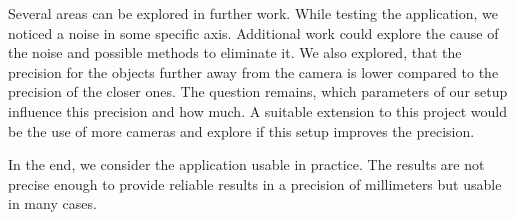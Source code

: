 Several areas can be explored in further work. While testing the application,
we noticed a noise in some specific axis. Additional work could explore the
cause of the noise and possible methods to eliminate it. We also explored, that
the precision for the objects further away from the camera is lower compared to
the precision of the closer ones. The question remains, which parameters of our
setup influence this precision and how much. A suitable extension to this
project would be the use of more cameras and explore if this setup improves the
precision.

In the end, we consider the application usable in practice. The results are not
precise enough to provide reliable results in a precision of millimeters but
usable in many cases.
